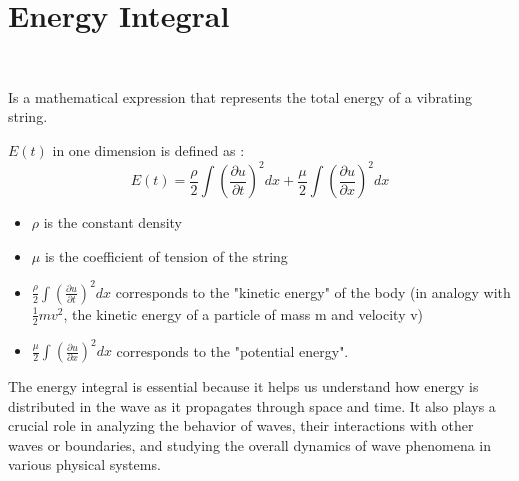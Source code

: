 \newpage

\section{Energy Integral}
\
\begin{definition} 
    Is a mathematical expression that represents the total energy of a vibrating string.
\end{definition}
$E(t)$ in one dimension is defined as :
\[
E(t)  =  \frac{\rho}{2} \int {\left(\frac{\partial u}{\partial t}\right)}^2 dx + \frac{\mu}{2} \int {\left(\frac{\partial u}{\partial x}\right)}^2 dx
\] 
\begin{itemize}
    \item $\rho$ is the constant density
    \item $\mu$ is the coefficient of tension of the string
    \item $\displaystyle \frac{\rho}{2} \int {\left(\frac{\partial u}{\partial t}\right)}^2 dx $ corresponds to the "kinetic energy" of the body (in analogy with $\frac{1}{2}mv^2$, the kinetic energy of a particle of mass m and velocity v)
    \item $\displaystyle \frac{\mu}{2} \int {\left(\frac{\partial u}{\partial x}\right)}^2 dx $ corresponds to the "potential energy".
\end{itemize}

The energy integral is essential because it helps us understand how energy is distributed in the wave as it propagates through space and time. It also plays a crucial role in analyzing the behavior of waves, their interactions with other waves or boundaries, and studying the overall dynamics of wave phenomena in various physical systems.

